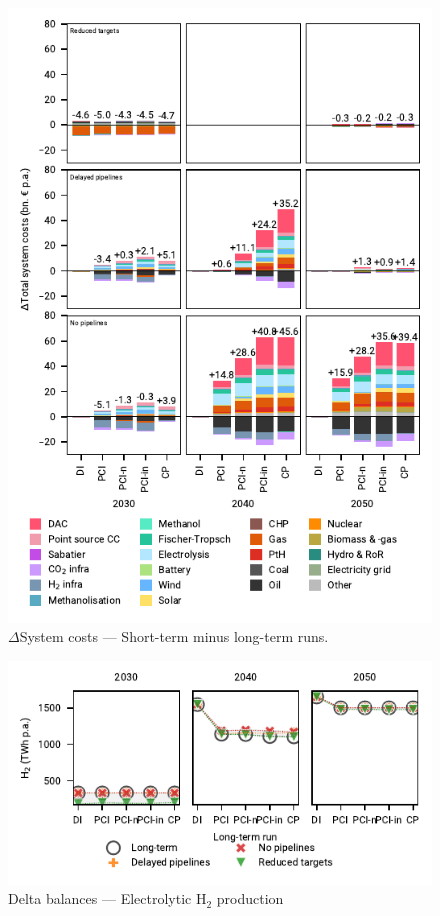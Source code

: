 \documentclass[pdflatex,sn-nature]{sn-jnl}
\theoremstyle{thmstyleone}%
\theoremstyle{thmstyletwo}%
\theoremstyle{thmstylethree}%
\begin{document}
\begin{appendices}
\begin{figure}[htbp]
  \centering
  \includegraphics{figures/costs_overview_extended}
  \caption{$\Delta$System costs --- Short-term minus long-term runs.}
  \label{fig:costs_overview_extended}
\end{figure}

\begin{figure}[htbp]
  \centering
  \includegraphics{figures/delta_balances_H2_Electrolysis}
  \caption{Delta balances --- Electrolytic H$_2$ production}
  \label{fig:delta_balances_h2_electrolysis}
\end{figure}


\end{appendices}
\end{document}
